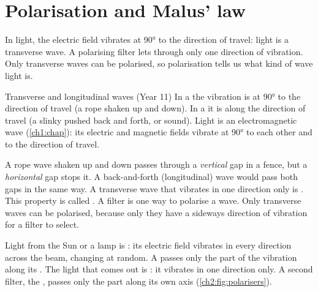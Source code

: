 \section{Polarisation and Malus' law}\label{ch2:sec:polarisation}

\begin{bigidea}
In light, the electric field vibrates at \ang{90} to the direction of travel: light is a
transverse wave. A polarising filter lets through only one direction of vibration. Only
transverse waves can be polarised, so polarisation tells us what kind of wave light is.
\end{bigidea}

\begin{keywords}
\end{keywords}

\begin{refresher}{Transverse and longitudinal waves (Year 11)}
In a  the vibration is at \ang{90} to the direction of travel (a rope
shaken up and down). In a  it is along the direction of travel (a
slinky pushed back and forth, or sound). Light is an electromagnetic wave
(\cref{ch1:chap}): its electric and magnetic fields vibrate at \ang{90} to each other and
to the direction of travel.
\end{refresher}

A rope wave shaken up and down passes through a \emph{vertical} gap in a fence, but a
\emph{horizontal} gap stops it. A back-and-forth (longitudinal) wave would pass both gaps
in the same way. A transverse wave that vibrates in one direction only is
. This property is called . A filter is one way to
polarise a wave. Only transverse waves can be polarised, because only they have a sideways
direction of vibration for a filter to select.

Light from the Sun or a lamp is : its electric field vibrates in every
direction across the beam, changing at random. A  passes only the part of
the vibration along its . The light that comes out is
: it vibrates in one direction only. A second filter, the
, passes only the part along its own axis (\cref{ch2:fig:polarisers}).

